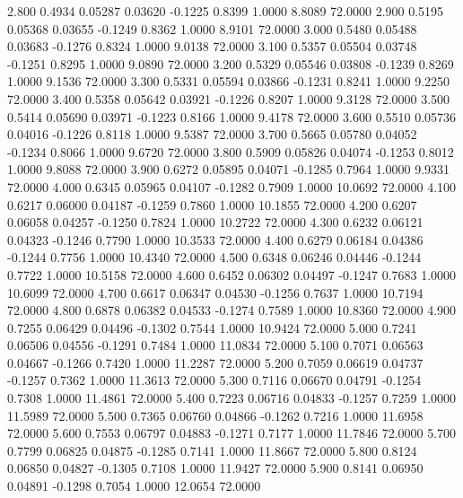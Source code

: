   2.800   0.4934   0.05287   0.03620  -0.1225   0.8399   1.0000   8.8089  72.0000
   2.900   0.5195   0.05368   0.03655  -0.1249   0.8362   1.0000   8.9101  72.0000
   3.000   0.5480   0.05488   0.03683  -0.1276   0.8324   1.0000   9.0138  72.0000
   3.100   0.5357   0.05504   0.03748  -0.1251   0.8295   1.0000   9.0890  72.0000
   3.200   0.5329   0.05546   0.03808  -0.1239   0.8269   1.0000   9.1536  72.0000
   3.300   0.5331   0.05594   0.03866  -0.1231   0.8241   1.0000   9.2250  72.0000
   3.400   0.5358   0.05642   0.03921  -0.1226   0.8207   1.0000   9.3128  72.0000
   3.500   0.5414   0.05690   0.03971  -0.1223   0.8166   1.0000   9.4178  72.0000
   3.600   0.5510   0.05736   0.04016  -0.1226   0.8118   1.0000   9.5387  72.0000
   3.700   0.5665   0.05780   0.04052  -0.1234   0.8066   1.0000   9.6720  72.0000
   3.800   0.5909   0.05826   0.04074  -0.1253   0.8012   1.0000   9.8088  72.0000
   3.900   0.6272   0.05895   0.04071  -0.1285   0.7964   1.0000   9.9331  72.0000
   4.000   0.6345   0.05965   0.04107  -0.1282   0.7909   1.0000  10.0692  72.0000
   4.100   0.6217   0.06000   0.04187  -0.1259   0.7860   1.0000  10.1855  72.0000
   4.200   0.6207   0.06058   0.04257  -0.1250   0.7824   1.0000  10.2722  72.0000
   4.300   0.6232   0.06121   0.04323  -0.1246   0.7790   1.0000  10.3533  72.0000
   4.400   0.6279   0.06184   0.04386  -0.1244   0.7756   1.0000  10.4340  72.0000
   4.500   0.6348   0.06246   0.04446  -0.1244   0.7722   1.0000  10.5158  72.0000
   4.600   0.6452   0.06302   0.04497  -0.1247   0.7683   1.0000  10.6099  72.0000
   4.700   0.6617   0.06347   0.04530  -0.1256   0.7637   1.0000  10.7194  72.0000
   4.800   0.6878   0.06382   0.04533  -0.1274   0.7589   1.0000  10.8360  72.0000
   4.900   0.7255   0.06429   0.04496  -0.1302   0.7544   1.0000  10.9424  72.0000
   5.000   0.7241   0.06506   0.04556  -0.1291   0.7484   1.0000  11.0834  72.0000
   5.100   0.7071   0.06563   0.04667  -0.1266   0.7420   1.0000  11.2287  72.0000
   5.200   0.7059   0.06619   0.04737  -0.1257   0.7362   1.0000  11.3613  72.0000
   5.300   0.7116   0.06670   0.04791  -0.1254   0.7308   1.0000  11.4861  72.0000
   5.400   0.7223   0.06716   0.04833  -0.1257   0.7259   1.0000  11.5989  72.0000
   5.500   0.7365   0.06760   0.04866  -0.1262   0.7216   1.0000  11.6958  72.0000
   5.600   0.7553   0.06797   0.04883  -0.1271   0.7177   1.0000  11.7846  72.0000
   5.700   0.7799   0.06825   0.04875  -0.1285   0.7141   1.0000  11.8667  72.0000
   5.800   0.8124   0.06850   0.04827  -0.1305   0.7108   1.0000  11.9427  72.0000
   5.900   0.8141   0.06950   0.04891  -0.1298   0.7054   1.0000  12.0654  72.0000
